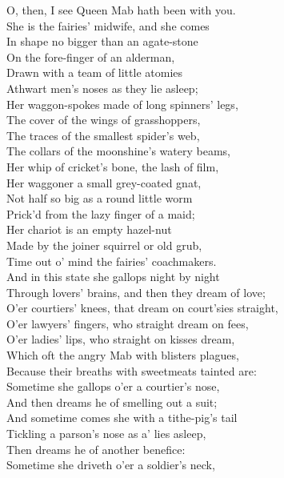 \begin{speech}
O, then, I see Queen Mab hath been with you. \\
She is the fairies' midwife, and she comes \\
In shape no bigger than an agate-stone \\
On the fore-finger of an alderman, \\
Drawn with a team of little atomies \\
Athwart men's noses as they lie asleep; \\
Her waggon-spokes made of long spinners' legs, \\
The cover of the wings of grasshoppers, \\
The traces of the smallest spider's web, \\
The collars of the moonshine's watery beams, \\
Her whip of cricket's bone, the lash of film, \\
Her waggoner a small grey-coated gnat, \\
Not half so big as a round little worm \\
Prick'd from the lazy finger of a maid; \\
Her chariot is an empty hazel-nut \\
Made by the joiner squirrel or old grub, \\
Time out o' mind the fairies' coachmakers. \\
And in this state she gallops night by night \\
Through lovers' brains, and then they dream of love; \\
O'er courtiers' knees, that dream on court'sies straight, \\
O'er lawyers' fingers, who straight dream on fees, \\
O'er ladies' lips, who straight on kisses dream, \\
Which oft the angry Mab with blisters plagues, \\
Because their breaths with sweetmeats tainted are: \\
Sometime she gallops o'er a courtier's nose, \\
And then dreams he of smelling out a suit; \\
And sometime comes she with a tithe-pig's tail \\
Tickling a parson's nose as a' lies asleep, \\
Then dreams he of another benefice: \\
Sometime she driveth o'er a soldier's neck, \\

\end{speech}
